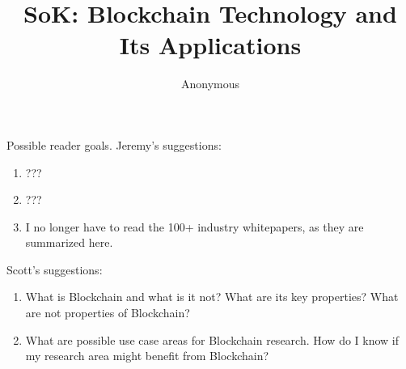 \documentclass[10pt, conference, compsocconf]{IEEEtran}
\begin{document}
\title{SoK: Blockchain Technology and Its Applications}
\author{Anonymous}
\maketitle



\IEEEpeerreviewmaketitle
\thispagestyle{plain}
\pagestyle{plain}


Possible reader goals. Jeremy's suggestions:
\begin{enumerate}
	\item ???
	\item ???
	\item I no longer have to read the 100+ industry whitepapers, as they are summarized here.
\end{enumerate}

Scott's suggestions:
\begin{enumerate}
	\item What is Blockchain and what is it not? What are its key properties? What are not properties of Blockchain?
	
	\item What are possible use case areas for Blockchain research. How do I know if my research area might benefit from Blockchain?
\end{enumerate}










\cite{small}


\footnotesize

\normalsize


\end{document}
